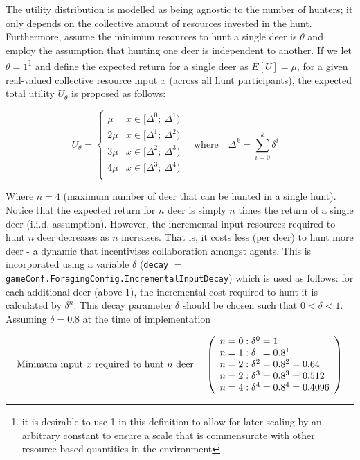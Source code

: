 The utility distribution is modelled as being agnostic to the number of hunters; it only depends on the collective amount of resources invested in the hunt. Furthermore, assume the minimum resources to hunt a single deer is $\theta$ and employ the assumption that hunting one deer is independent to another. If we let $\theta=1$\footnote{it is desirable to use 1 in this definition to allow for later scaling by an arbitrary constant to ensure a scale that is commensurate with other resource-based quantities in the environment} and define the expected return for a single deer as $E[U]=\mu$, for a given real-valued collective resource input $x$ (across all hunt participants), the expected total utility $U_{\theta}$ is proposed as follows:

\begin{equation}
U_{\theta}=\left\{\begin{array}{ll}
\mu & x \in[\Delta^0; \ \Delta^1)\\
2 \mu & x\in[\Delta^1; \ \Delta^2)\\
3 \mu & x\in[\Delta^2; \ \Delta^3)\\
4 \mu & x\in[\Delta^3; \ \Delta^4)\\
\end{array}\right.  \quad \text{where} \quad \Delta^k= \sum_{i=0}^k\delta^i  \quad 
\end{equation}

Where $n=4$ (maximum number of deer that can be hunted in a single hunt). Notice that the expected return for $n$ deer is simply $n$ times the return of a single deer (i.i.d. assumption). However, the incremental input resources required to hunt $n$ deer decreases as $n$ increases. That is, it costs less (per deer) to hunt more deer - a dynamic that incentivises collaboration amongst agents. This is incorporated using a variable $\delta$ (\texttt{decay} $=$ \texttt{gameConf.ForagingConfig.IncrementalInputDecay}) which is used as follows: for each additional deer (above 1), the incremental cost required to hunt it is calculated by $\delta^n$. This decay parameter $\delta$ should be chosen such that $0< \delta< 1$. Assuming $\delta=0.8$ at the time of implementation 

\begin{equation}
\text{Minimum input $x$ required to hunt $n$ deer}=
\left( \begin{array}{ll@{}}
n=0: \delta^0 = 1 \\
n=1: \delta^1 = 0.8^1 \\
n=2: \delta^2 = 0.8^2 = 0.64 \\
n=2: \delta^3 = 0.8^3 = 0.512 \\
n=4: \delta^4 = 0.8^4 = 0.4096\\ 
\end{array} \right)
\end{equation}

